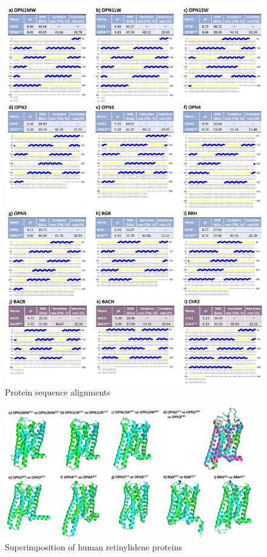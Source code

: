 \documentclass[fleqn,10pt,lineno]{manuscript}
\begin{document}
\begin{figure}[htbp]
	\centering
	\includegraphics[width=\linewidth]{Figures/sequences.jpg}
	\caption{Protein sequence alignments}
	\label{fig:sequences}
\end{figure}

\begin{figure}[htbp]
	\centering
	\includegraphics[width=\linewidth]{Figures/superimposition-human.jpg}
	\caption{Superimposition of human retinylidene proteins}
	\label{fig:humansup}
\end{figure}
\end{document}
